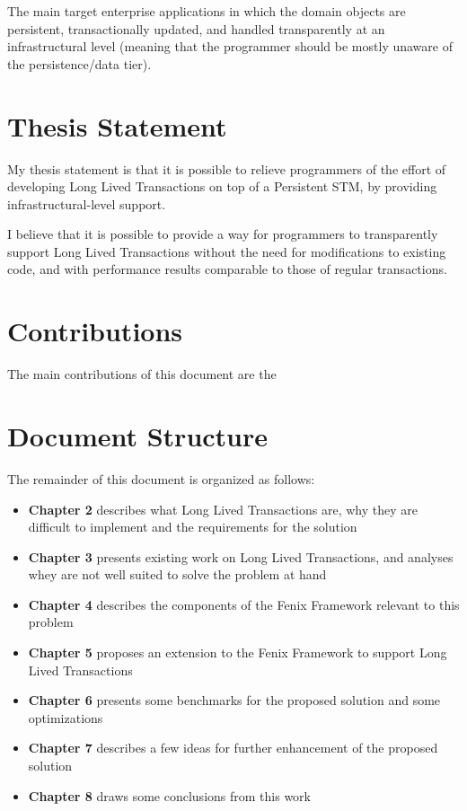 The main target enterprise applications in
which the domain objects are persistent, transactionally updated, and
handled transparently at an infrastructural level (meaning that the
programmer should be mostly unaware of the persistence/data tier).

\section{Thesis Statement}

My thesis statement is that it is possible to relieve programmers of
the effort of developing Long Lived Transactions on top of a
Persistent STM, by providing infrastructural-level support.

I believe that it is possible to provide a way for programmers to
transparently support Long Lived Transactions without the need for
modifications to existing code, and with performance results
comparable to those of regular transactions.

\section{Contributions}

The main contributions of this document are the 

\section{Document Structure}

The remainder of this document is organized as follows:

\begin{itemize}

\item {\bf Chapter 2} describes what Long Lived Transactions are, why
  they are difficult to implement and the requirements for the solution

\item {\bf Chapter 3} presents existing work on Long Lived
  Transactions, and analyses whey are not well suited to solve the
  problem at hand

\item {\bf Chapter 4} describes the components of the Fenix Framework
  relevant to this problem

\item {\bf Chapter 5} proposes an extension to the Fenix Framework to
  support Long Lived Transactions

\item {\bf Chapter 6} presents some benchmarks for the proposed
  solution and some optimizations

\item {\bf Chapter 7} describes a few ideas for further enhancement of
  the proposed solution

\item {\bf Chapter 8} draws some conclusions from this work

\end{itemize}